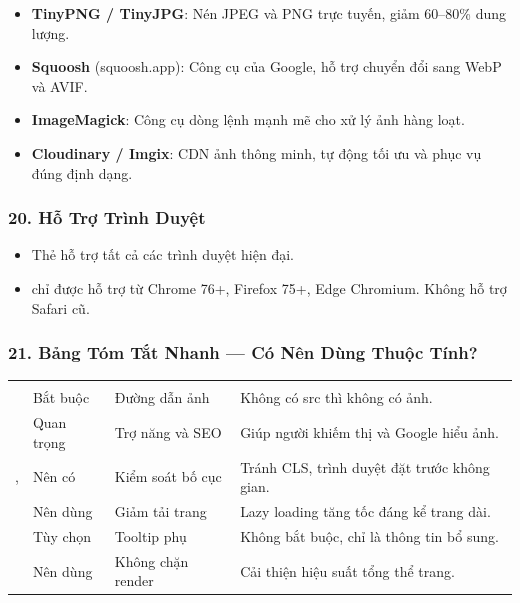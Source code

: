 \begin{tipBox}
\begin{itemize}[leftmargin=1.5em, itemsep=2pt, parsep=0pt]
    \item \textbf{TinyPNG / TinyJPG}: Nén JPEG và PNG trực tuyến, giảm 60--80\% dung lượng.
    \item \textbf{Squoosh} (squoosh.app): Công cụ của Google, hỗ trợ chuyển đổi sang WebP và AVIF.
    \item \textbf{ImageMagick}: Công cụ dòng lệnh mạnh mẽ cho xử lý ảnh hàng loạt.
    \item \textbf{Cloudinary / Imgix}: CDN ảnh thông minh, tự động tối ưu và phục vụ đúng định dạng.
\end{itemize}
\end{tipBox}

\subsubsection{20. Hỗ Trợ Trình Duyệt}

\begin{noteBox}
\begin{itemize}[leftmargin=1.5em, itemsep=2pt, parsep=0pt]
    \item Thẻ  hỗ trợ tất cả các trình duyệt hiện đại.
    \item {} chỉ được hỗ trợ từ Chrome 76+, Firefox 75+, Edge Chromium. Không hỗ trợ Safari cũ.
\end{itemize}
\end{noteBox}

\subsubsection{21. Bảng Tóm Tắt Nhanh — Có Nên Dùng Thuộc Tính?}

\begin{prettyTableBox}
\begin{tabularx}{\linewidth}{C{2.5cm} C{2.5cm} L{3cm} Z}
 &  &  &  \\
 & Bắt buộc & Đường dẫn ảnh & Không có src thì không có ảnh. \\
 & Quan trọng & Trợ năng và SEO & Giúp người khiếm thị và Google hiểu ảnh. \\
,  & Nên có & Kiểm soát bố cục & Tránh CLS, trình duyệt đặt trước không gian. \\
 & Nên dùng & Giảm tải trang & Lazy loading tăng tốc đáng kể trang dài. \\
 & Tùy chọn & Tooltip phụ & Không bắt buộc, chỉ là thông tin bổ sung. \\
 & Nên dùng & Không chặn render & Cải thiện hiệu suất tổng thể trang. \\
\end{tabularx}
\end{prettyTableBox}

